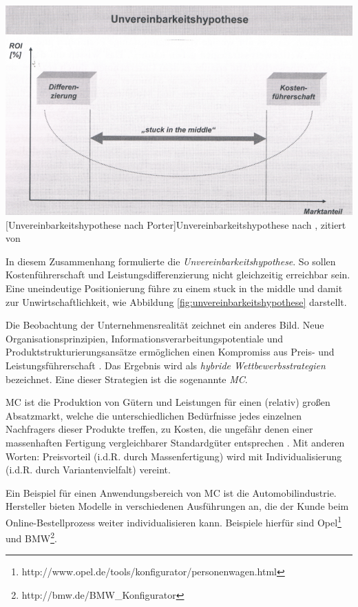 \documentclass[11pt, a4paper, titlepage, listof=totoc, bibliography=totoc, index=totoc, twoside, openright, headings=normal, draft]{scrreprt}
\begin{document}
\vspace{1em}
\begin{minipage}{\linewidth}
	\centering
	\includegraphics[width=0.7\linewidth]{Abbildungen/unvereinbarkeitshypothese.png}
	[Unvereinbarkeitshypothese nach Porter]{Unvereinbarkeitshypothese nach \cite{porter80}, zitiert von \cite{schuh05}}
	\label{fig:unvereinbarkeitshypothese}
\end{minipage}
\vspace{0.3em}

In diesem Zusammenhang formulierte \citeauthor{porter80} die \emph{Unvereinbarkeitshypothese}. So sollen Kostenführerschaft und Leistungsdifferenzierung nicht gleichzeitig erreichbar sein. Eine uneindeutige Positionierung führe zu einem \glqq stuck in the middle\grqq{} und damit zur Unwirtschaftlichkeit, wie Abbildung \ref{fig:unvereinbarkeitshypothese} darstellt.

Die Beobachtung der Unternehmensrealität zeichnet ein anderes Bild. Neue Organisationsprinzipien, Informationsverarbeitungspotentiale und Produktstrukturierungsansätze ermöglichen einen Kompromiss aus Preis- und Leistungsführerschaft \citep{schuh05}. Das Ergebnis wird als \emph{hybride Wettbewerbsstrategien} bezeichnet. Eine dieser Strategien ist die sogenannte \emph{\ac{MC}}.

\ac{MC} ist die \glqq Produktion von Gütern und Leistungen für einen (relativ) großen Absatzmarkt, welche die unterschiedlichen Bedürfnisse jedes einzelnen Nachfragers dieser Produkte treffen, zu Kosten, die ungefähr denen einer massenhaften Fertigung vergleichbarer Standardgüter entsprechen\grqq{} \citep{piller98}. Mit anderen Worten: Preisvorteil (\ac{i.d.R.} durch Massenfertigung) wird mit Individualisierung (\ac{i.d.R.} durch Variantenvielfalt) vereint.

Ein Beispiel für einen Anwendungsbereich von \ac{MC} ist die Automobilindustrie. Hersteller bieten  Modelle in verschiedenen Ausführungen an, die der Kunde beim Online-Bestellprozess weiter individualisieren kann. Beispiele hierfür sind Opel\footnote{http://www.opel.de/tools/konfigurator/personenwagen.html} und BMW\footnote{http://bmw.de/BMW\_Konfigurator}.
\end{document}
